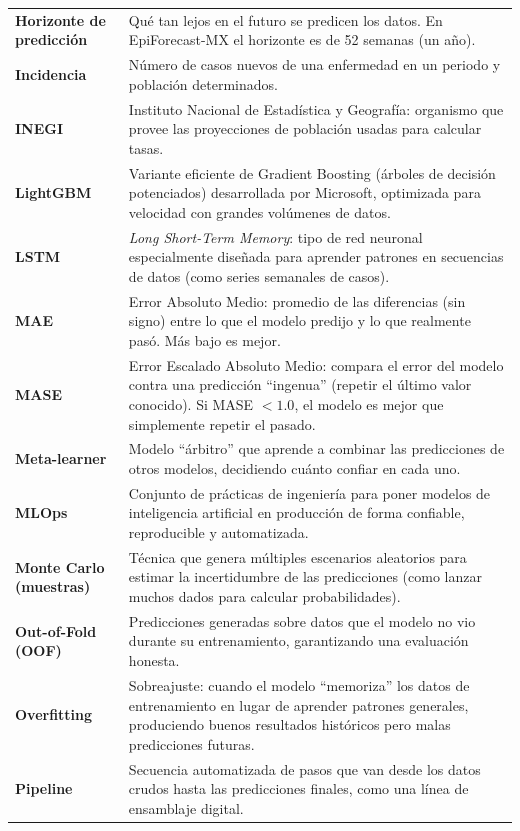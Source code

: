 \documentclass[12pt, letterpaper]{article}
\begin{document}
\begin{longtable}{>{\bfseries\small}p{3.8cm} p{11.5cm}}
\addlinespace
Horizonte de predicción & Qué tan lejos en el futuro se predicen los datos. En EpiForecast-MX el horizonte es de 52 semanas (un año). \\
\addlinespace
Incidencia & Número de casos nuevos de una enfermedad en un periodo y población determinados. \\
\addlinespace
INEGI & Instituto Nacional de Estadística y Geografía: organismo que provee las proyecciones de población usadas para calcular tasas. \\
\addlinespace
LightGBM & Variante eficiente de Gradient Boosting (árboles de decisión potenciados) desarrollada por Microsoft, optimizada para velocidad con grandes volúmenes de datos. \\
\addlinespace
LSTM & \textit{Long Short-Term Memory}: tipo de red neuronal especialmente diseñada para aprender patrones en secuencias de datos (como series semanales de casos). \\
\addlinespace
MAE & Error Absoluto Medio: promedio de las diferencias (sin signo) entre lo que el modelo predijo y lo que realmente pasó. Más bajo es mejor. \\
\addlinespace
MASE & Error Escalado Absoluto Medio: compara el error del modelo contra una predicción ``ingenua'' (repetir el último valor conocido). Si MASE $< 1.0$, el modelo es mejor que simplemente repetir el pasado. \\
\addlinespace
Meta-learner & Modelo ``árbitro'' que aprende a combinar las predicciones de otros modelos, decidiendo cuánto confiar en cada uno. \\
\addlinespace
MLOps & Conjunto de prácticas de ingeniería para poner modelos de inteligencia artificial en producción de forma confiable, reproducible y automatizada. \\
\addlinespace
Monte Carlo (muestras) & Técnica que genera múltiples escenarios aleatorios para estimar la incertidumbre de las predicciones (como lanzar muchos dados para calcular probabilidades). \\
\addlinespace
Out-of-Fold (OOF) & Predicciones generadas sobre datos que el modelo no vio durante su entrenamiento, garantizando una evaluación honesta. \\
\addlinespace
Overfitting & Sobreajuste: cuando el modelo ``memoriza'' los datos de entrenamiento en lugar de aprender patrones generales, produciendo buenos resultados históricos pero malas predicciones futuras. \\
\addlinespace
Pipeline & Secuencia automatizada de pasos que van desde los datos crudos hasta las predicciones finales, como una línea de ensamblaje digital. \\

\end{longtable}
\end{document}
